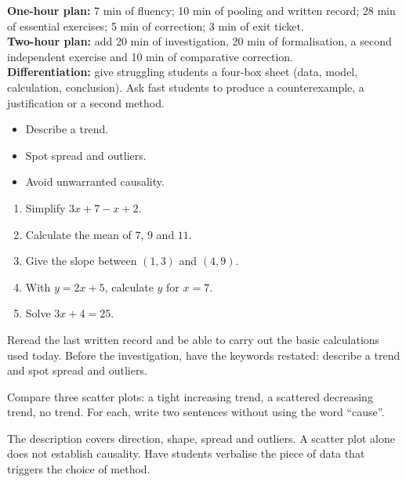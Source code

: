 \ifmxteacher
\begin{method}
\textbf{One-hour plan:} 7 min of fluency; 10 min of pooling and written record; 28 min of essential exercises; 5 min of correction; 3 min of exit ticket.\\
\textbf{Two-hour plan:} add 20 min of investigation, 20 min of formalisation, a second independent exercise and 10 min of comparative correction.\\
\textbf{Differentiation:} give struggling students a four-box sheet (data, model, calculation, conclusion). Ask fast students to produce a counterexample, a justification or a second method.
\end{method}
\fi
{}
\begin{objectives}\begin{itemize}\item Describe a trend.\item Spot spread and outliers.\item Avoid unwarranted causality.\end{itemize}\end{objectives}
\begin{fluency}\begin{enumerate}\item Simplify $3x+7-x+2$. \item Calculate the mean of $7$, $9$ and $11$. \item Give the slope between $(1,3)$ and $(4,9)$. \item With $y=2x+5$, calculate $y$ for $x=7$. \item Solve $3x+4=25$. \end{enumerate}\end{fluency}
\begin{prerequisites}Reread the last written record and be able to carry out the basic calculations used today. Before the investigation, have the keywords restated: describe a trend and spot spread and outliers.\end{prerequisites}

\begin{activity}
Compare three scatter plots: a tight increasing trend, a scattered decreasing trend, no trend. For each, write two sentences without using the word ``cause''.

\end{activity}
\begin{solution}The description covers direction, shape, spread and outliers. A scatter plot alone does not establish causality. Have students verbalise the piece of data that triggers the choice of method.\end{solution}

